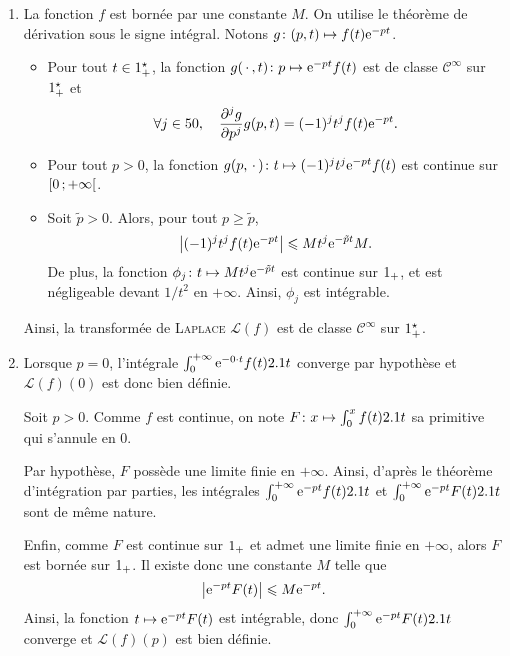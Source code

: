 \begin{demo}
\begin{enumerate}
\item {}La fonction $f$ est bornée par une constante $M$. On utilise le théorème de dérivation sous le signe intégral. Notons $\fonctionligne[g]{(p, t)}{f(t) \e^{-pt}}$.
\begin{itemize}
\item Pour tout $t \in \Rpe$, la fonction $\fonctionligne[g(\,\cdot\,, t)]{p}{\e^{-p t} f(t)}$ est de classe $\mathscr{C}^\infty$ sur $\Rpe$ et
\[
\forall j \in \N,\quad \frac{\partial^j g}{\partial p^j} g(p, t) = (-1)^j t^j f(t) \e^{-pt}.
\]

\item Pour tout $p > 0$, la fonction $\fonctionligne[g(p,\,\cdot\,)]{t}{(-1)^j t^j \e^{-p t} f(t)}$ est continue sur $\interfo{0}{+\infty}$.

\item Soit $\tilde{p} > 0$. Alors, pour tout $p \geqslant \tilde{p}$,
\[
\abs{(-1)^j t^j f(t) \e^{-p t}} \leqslant M t^j \e^{- \tilde{p} t} M.
\]
De plus, la fonction $\fonctionligne[\phi_j]{t}{M t^j \e^{-\tilde{p} t}}$ est continue sur $\Rp$, et est négligeable devant $1/t^2$ en $+\infty$. Ainsi, $\phi_j$ est intégrable.
\end{itemize}
Ainsi, la transformée de \textsc{Laplace} $\mathscr{L}(f)$ est de classe $\mathscr{C}^\infty$ sur $\Rpe$.

\item Lorsque $p = 0$, l'intégrale $\int_0^{+\infty} \e^{-0\cdot t} f(t) \d t$ converge par hypothèse et $\mathscr{L}(f)(0)$ est donc bien définie.

\medskip

Soit $p > 0$. Comme $f$ est continue, on note $\fonctionligne[F]{x}{\int_0^x f(t) \d t}$ sa primitive qui s'annule en $0$.

Par hypothèse, $F$ possède une limite finie en $+\infty$. Ainsi, d'après le théorème d'intégration par parties, les intégrales $\int_0^{+\infty} \e^{-p t} f(t) \d t$ et $\int_0^{+\infty} \e^{-p t} F(t) \d t$ sont de même nature.

Enfin, comme $F$ est continue sur $\Rp$ et admet une limite finie en $+\infty$, alors $F$ est bornée sur $\Rp$. Il existe donc une constante $M$ telle que
\[
\module{\e^{-p t} F(t)} \leqslant M \e^{-p t}.
\]
Ainsi, la fonction $t \mapsto \e^{-p t} F(t)$ est intégrable, donc $\int_0^{+\infty} \e^{-p t} F(t) \d t$ converge et $\mathscr{L}(f)(p)$ est bien définie.


\end{enumerate}
\end{demo}
